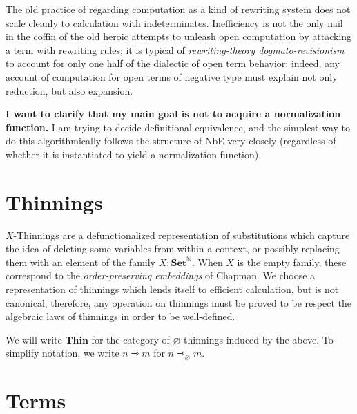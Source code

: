 \documentclass{article}
\DeclarePairedDelimiter\Squares{[}{]}
\newcommand\DeclBox[1]{\framebox{$\displaystyle{}#1$}}
\newcommand\FmtThin[1]{{\color{ProcessBlue}#1}}
\newcommand\XThin[3]{{#2}\rightarrowtriangle_{#1}{#3}}
\newcommand\Thin[2]{{#1}\rightarrowtriangle{#2}}
\newcommand\IsXThin[4]{\FmtThin{#1}:\XThin{#2}{#3}{#4}}
\newcommand\ThinId{\mathsf{id}}
\newcommand\ThinKeep[1]{\mbox{\leftthumbsdown}\!\!\rangle\!{#1}\!\langle\!\!\mbox{\rightthumbsdown}}
\newcommand\ThinSkip[1]{{#1}.\mbox{\faTrashO}}
\newcommand\ThinRep[2]{{#1}.\Squares*{{\normalcolor{}#2}}}
\newcommand\THIN{\mathbf{Thin}}
\newcommand\SET{\mathbf{Set}}
\begin{document}
The old practice of regarding computation as a kind of rewriting
system does not scale cleanly to calculation with
indeterminates. Inefficiency is not the only nail in the coffin of the
old heroic attempts to unleash open computation by attacking a term
with rewriting rules; it is typical of \emph{rewriting-theory
  dogmato-revisionism} to account for only one half of the dialectic
of open term behavior: indeed, any account of computation for open
terms of negative type must explain not only reduction, but also
expansion.

\textbf{I want to clarify that my main goal is not to acquire a normalization
function.} I am trying to decide definitional equivalence, and the simplest way
to do this algorithmically follows the structure of NbE very closely
(regardless of whether it is instantiated to yield a normalization function).


\section{Thinnings}

$X$-Thinnings are a defunctionalized representation of substitutions
which capture the idea of deleting some variables from within a
context, or possibly replacing them with an element of the family
$X:\SET^{\mathbb{N}}$. When $X$ is the empty family, these correspond
to the \emph{order-preserving embeddings} of Chapman.
%
We choose a representation of thinnings which lends itself to
efficient calculation, but is not canonical; therefore, any operation
on thinnings must be proved to be respect the algebraic laws of
thinnings in order to be well-defined.

We will write $\THIN$ for the category of $\varnothing$-thinnings
induced by the above. To simplify notation, we write $\Thin{n}{m}$ for
$\XThin{\varnothing}{n}{m}$.

\section{Terms}
\end{document}
